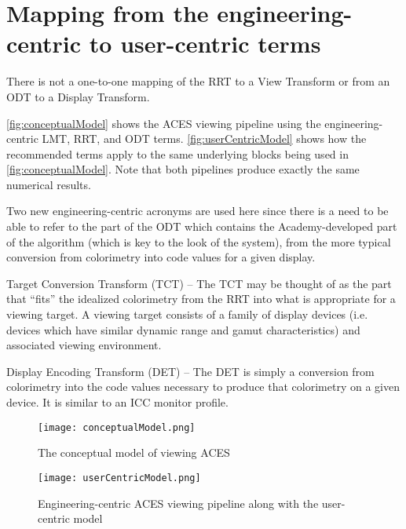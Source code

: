\numberedformat
\chapter{Mapping from the engineering-centric to user-centric terms}

There is not a one-to-one mapping of the RRT to a View Transform or from an ODT to a Display Transform. 

\autoref{fig:conceptualModel} shows the ACES viewing pipeline using the engineering-centric LMT, RRT, and ODT terms. \autoref{fig:userCentricModel} shows how the recommended terms apply to the same underlying blocks being used in \autoref{fig:conceptualModel}. Note that both pipelines produce exactly the same numerical results.

Two new engineering-centric acronyms are used here since there is a need to be able to refer to the part of the ODT which contains the Academy-developed part of the algorithm (which is key to the look of the system), from the more typical conversion from colorimetry into code values for a given display.

Target Conversion Transform (TCT) -- The TCT may be thought of as the part that ``fits'' the idealized colorimetry from the RRT into what is appropriate for a viewing target. A viewing target consists of a family of display devices (i.e. devices which have similar dynamic range and gamut characteristics) and associated viewing environment.

Display Encoding Transform (DET) -- The DET is simply a conversion from colorimetry into the code values necessary to produce that colorimetry on a given device. It is similar to an ICC monitor profile.

\begin{figure}[htbp]
\begin{center}
    \texttt{[image: conceptualModel.png]}
\caption{The conceptual model of viewing ACES}
\label{fig:conceptualModel}
\end{center}
\end{figure}

\begin{figure}[htbp]
\begin{center}
    \texttt{[image: userCentricModel.png]}
\caption{Engineering-centric ACES viewing pipeline along with the user-centric model}
\label{fig:userCentricModel}
\end{center}
\end{figure}
